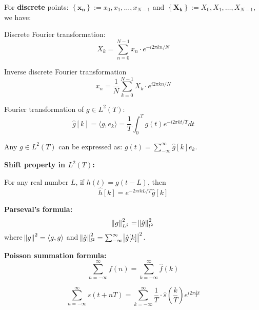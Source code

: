 \documentclass[12pt]{article}
\numberwithin{equation}{section}
\begin{document}
For \textbf{discrete} points: $\left \{ \mathbf{ x_n } \right \} := x_0, x_1, \ldots, x_{N-1}$ and 
$\left \{ \mathbf{X_k} \right \} := X_0, X_1, \ldots, X_{N-1}$, we have: \par
Discrete Fourier transformation: 
\begin{equation}\label{eq:fourierdisc}
	X_k = \sum_{n=0}^{N-1} x_n \cdot e^{-i2\pi kn/N}
\end{equation} \par
Inverse discrete Fourier transformation
\begin{equation}
x_n = \frac{1}{N}\sum_{k=0}^{N-1}X_k \cdot e^{i 2 \pi kn/N} 
\end{equation} \par 

Fourier transformation of $g \in L^2(T)$: 
\begin{equation}\label{eq:fourierL2T}
	\hat{g}[k] = \langle g , e_k \rangle = \frac{1}{T} \int^{T}_{0} g(t)e^{-i 2\pi kt/T} dt
\end{equation} \par

Any $g \in L^2(T)$ can be expressed as: $g(t)=\sum^{\infty}_{-\infty}\hat{g}[k] e_k$. \par
\textbf{Shift property in $L^2(T)$:}  \par
For any real number $L$, if $h(t)=g(t-L)$, then
\begin{equation} \label{eq:fouriershift}
	\hat{h}[k]=e^{-2\pi i k L / T} \hat{g}[k]
\end{equation}

\textbf{Parseval's formula:}
\begin{equation} \label{eq:parseval}
	\norm{g}^2_{L^2}=\norm{\hat{g}}^2_{l^2}
\end{equation}
where $\norm{g}^2= \langle g , g \rangle$ and $\norm{\hat{g}}^2_{l^2}=\sum^{\infty}_{-\infty}\abs{\hat{g}[k]}^2$. \par

\textbf{Poisson summation formula:}
\begin{equation}
	\sum_{n=-\infty}^\infty f(n)=\sum_{k=-\infty}^\infty \hat f\left(k\right)
\end{equation} \par
\begin{equation} \label{eq:poisson}
	\sum_{n=-\infty}^{\infty} s(t + nT)=\sum_{k=-\infty}^{\infty} \frac{1}{T}\cdot \hat s\left(\frac{k}{T}\right)e^{i 2\pi \frac{k}{T} t }
\end{equation} \par
\end{document}
